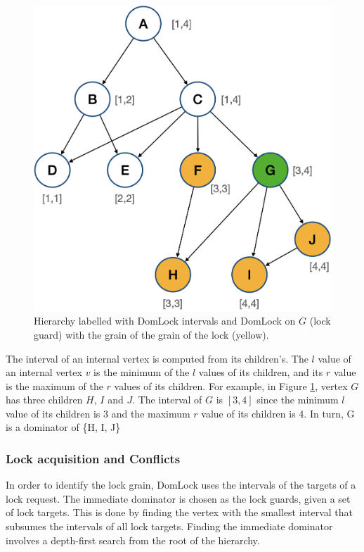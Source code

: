 \begin{figure}
    \centering
    \captionsetup{justification=centering}
    \includegraphics[width=.6\textwidth]{figures/domlock_example_with_lock.png}
    \caption{Hierarchy labelled with DomLock intervals and DomLock on $G$ (lock guard) with the grain of the grain of the lock (yellow).}
    \label{fig:domlock_example_locked}
\end{figure}

The interval of an internal vertex is computed from its children's. The $l$ value of an internal vertex $v$ is the minimum of the $l$ values of its children, and its $r$ value is the maximum of the $r$ values of its children. For example, in Figure \ref{fig:domlock_example_locked}, vertex $G$ has three children $H$, $I$ and $J$. The interval of $G$ is $[3,4]$ since the minimum $l$ value of its children is 3 and the maximum $r$ value of its children is 4. In turn, G is a dominator of \{H, I, J\}

\subsubsection{Lock acquisition and Conflicts}

In order to identify the lock grain, DomLock uses the intervals of the targets of a lock request. The immediate dominator is chosen as the lock guards, given a set of lock targets. This is done by finding the vertex with the smallest interval that subsumes the intervals of all lock targets.
Finding the immediate dominator involves a depth-first search from the root of the hierarchy.  

